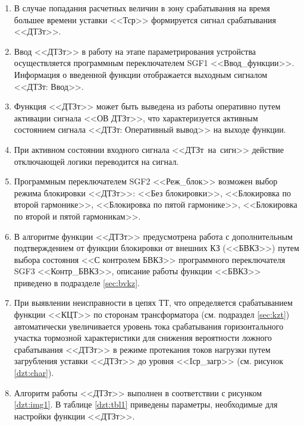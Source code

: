 \documentclass[a4paper, 12pt,table, hidelinks, DIV=calc]{extarticle} %
\begin{document}
\begin{enumerate}[label=\arabic{section}.\arabic{subsection}.\arabic{enumi}, labelsep=4pt, leftmargin=0pt, itemindent=57pt, itemsep=0pt, parsep=5pt]
\begin{enumerate}[label=\arabic{section}.\arabic{subsection}.\arabic{enumi}.\arabic*, labelsep=4pt, leftmargin=0em, itemindent=65pt, parsep=0pt]
\item
В случае попадания расчетных величин в зону срабатывания на время большее времени уставки <<Тср>> формируется сигнал срабатывания <<ДТЗт>>.

\item
Ввод <<ДТЗт>> в работу на этапе параметрирования устройства осуществляется программным переключателем SGF1 <<Ввод\_функции>>. Информация о введенной функции отображается выходным сигналом <<ДТЗт: Ввод>>.
\item
Функция <<ДТЗт>> может быть выведена из работы оперативно путем активации сигнала <<ОВ ДТЗт>>, что характеризуется активным состоянием сигнала <<ДТЗт: Оперативный вывод>> на выходе функции. 
\item
При активном состоянии входного сигнала <<ДТЗт~на~сигн>> действие отключающей логики переводится на сигнал.
\item
Программным переключателем SGF2 <<Реж\_блок>> возможен выбор режима блокировки <<ДТЗт>>: <<Без блокировки>>, <<Блокировка по второй гармонике>>, <<Блокировка по пятой гармонике>>, <<Блокировка по второй и пятой гармоникам>>.
\item
В алгоритме функции <<ДТЗт>> предусмотрена работа с дополнительным подтверждением от функции блокировки от внешних КЗ (<<БВКЗ>>) путем выбора состояния <<С контролем БВКЗ>> программного переключателя SGF3 <<Контр\_БВКЗ>>, описание работы функции <<БВКЗ>> приведено в подразделе \ref{sec:bvkz}.
\item
При выявлении неисправности в цепях ТТ, что определяется срабатыванием функции <<КЦТ>> по сторонам трансформатора (см. подраздел \ref{sec:kzt}) автоматически увеличивается уровень тока срабатывания горизонтального участка тормозной характеристики для снижения вероятности ложного срабатывания <<ДТЗт>> в режиме протекания токов нагрузки путем загрубления уставки <<ДТЗт>> до уровня <<Iср\_загр>> (см. рисунок \ref{dzt:char}).
\item
Алгоритм работы <<ДТЗт>> выполнен в соответствии с рисунком \ref{dzt:img1}. В таблице \ref{dzt:tbl1} приведены параметры, необходимые для настройки функции <<ДТЗт>>.


\end{enumerate}
\end{enumerate}
\end{document}
